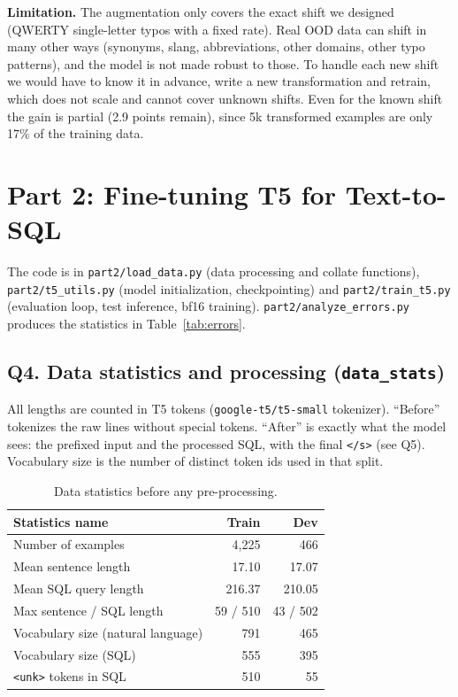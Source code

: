 \documentclass[11pt]{article}
\begin{document}
\textbf{Limitation.} The augmentation only covers the exact shift we designed (QWERTY single-letter typos with a
fixed rate). Real OOD data can shift in many other ways (synonyms, slang, abbreviations, other domains, other
typo patterns), and the model is not made robust to those. To handle each new shift we would have to know it in
advance, write a new transformation and retrain, which does not scale and cannot cover unknown shifts. Even for
the known shift the gain is partial (2.9 points remain), since 5k transformed examples are only 17\% of the
training data.

\section{Part 2: Fine-tuning T5 for Text-to-SQL}

The code is in \texttt{part2/load\_data.py} (data processing and collate functions),
\texttt{part2/t5\_utils.py} (model initialization, checkpointing) and \texttt{part2/train\_t5.py}
(evaluation loop, test inference, bf16 training). \texttt{part2/analyze\_errors.py} produces the statistics in
Table~\ref{tab:errors}.

\subsection{Q4. Data statistics and processing (\texttt{data\_stats})}

All lengths are counted in T5 tokens (\texttt{google-t5/t5-small} tokenizer). ``Before'' tokenizes the raw lines
without special tokens. ``After'' is exactly what the model sees: the prefixed input and the processed SQL, with the
final \texttt{</s>} (see Q5). Vocabulary size is the number of distinct token ids used in that split.

\begin{table}[H]
\centering
\begin{tabular}{lrr}
\toprule
Statistics name & Train & Dev \\
\midrule
Number of examples & 4{,}225 & 466 \\
Mean sentence length & 17.10 & 17.07 \\
Mean SQL query length & 216.37 & 210.05 \\
Max sentence / SQL length & 59 / 510 & 43 / 502 \\
Vocabulary size (natural language) & 791 & 465 \\
Vocabulary size (SQL) & 555 & 395 \\
\texttt{<unk>} tokens in SQL & 510 & 55 \\
\bottomrule
\end{tabular}
\caption{Data statistics before any pre-processing.}
\end{table}
\end{document}
